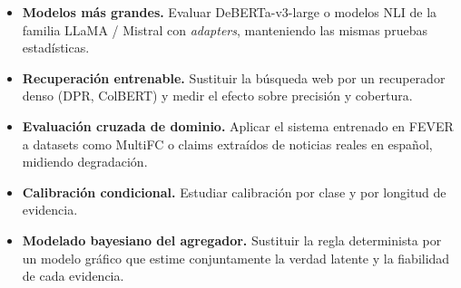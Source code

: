 \begin{itemize}[leftmargin=*,itemsep=0.2em]
  \item \textbf{Modelos más grandes.} Evaluar DeBERTa-v3-large o
        modelos NLI de la familia LLaMA / Mistral con \emph{adapters},
        manteniendo las mismas pruebas estadísticas.
  \item \textbf{Recuperación entrenable.} Sustituir la búsqueda web por
        un recuperador denso (DPR, ColBERT) y medir el efecto sobre
        precisión y cobertura.
  \item \textbf{Evaluación cruzada de dominio.} Aplicar el sistema
        entrenado en FEVER a datasets como MultiFC o claims extraídos
        de noticias reales en español, midiendo degradación.
  \item \textbf{Calibración condicional.} Estudiar calibración por clase
        y por longitud de evidencia.
  \item \textbf{Modelado bayesiano del agregador.} Sustituir la regla
        determinista por un modelo gráfico que estime conjuntamente la
        verdad latente y la fiabilidad de cada evidencia.
\end{itemize}
